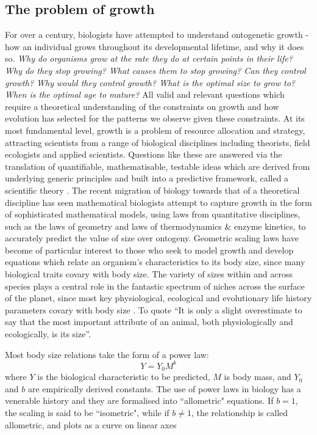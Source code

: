 \documentclass[a4paper]{article} %
\begin{document}
    \subsection{The problem of growth}
        For over a century, biologists have attempted to understand ontogenetic growth - how an individual grows throughout its developmental lifetime, and why it does so. \textit{Why do organisms grow at the rate they do at certain points in their life? Why do they stop growing? What causes them to stop growing? Can they control growth? Why would they control growth? What is the optimal size to grow to? When is the optimal age to mature?} All valid and relevant questions which require a theoretical understanding of the constraints on growth and how evolution has selected for the patterns we observe given these constraints. At its most fundamental level, growth is a problem of resource allocation and strategy, attracting scientists from a range of biological disciplines including theorists, field ecologists and applied scientists. Questions like these are answered via the translation of quantifiable, mathematisable, testable ideas which are derived from underlying generic principles and built into a predictive framework, called a scientific theory \autocite{popper1962,popper1972,peters1983, West2011}. The recent migration of biology towards that of a theoretical discipline has seen mathematical biologists attempt to capture growth in the form of sophisticated mathematical models, using laws from quantitative disciplines, such as the laws of geometry and laws of thermodynamics \& enzyme kinetics, to accurately predict the value of size over ontogeny. Geometric scaling laws have become of particular interest to those who seek to model growth and develop equations which relate an organism's characteristics to its body size, since many biological traits covary with body size. The variety of sizes within and across species plays a central role in the fantastic spectrum of niches across the surface of the planet, since most key physiological, ecological and evolutionary life history parameters covary with body size \autocite{peters1983, brown2000-scaling-book,schmidt1984scaling,Marshall2019b}. To quote \cite{Bartholomew1981} ``It is only a slight overestimate to say that the most important attribute of an animal, both physiologically and ecologically, is its size''. 

        Most body size relations take the form of a power law:
        \begin{equation*}
            Y = Y_0 M^b
        \end{equation*}
        where $Y$ is the biological characteristic to be predicted, $M$ is body mass, and $Y_0$ and $b$ are empirically derived constants. The use of power laws in biology has a venerable history and they are formalised into ``allometric" equations. If $b = 1$, the scaling is said to be ``isometric", while if $b \neq 1$, the relationship is called allometric, and plots as a curve on linear axes \autocite{brown2000-scaling-book}
\end{document}
